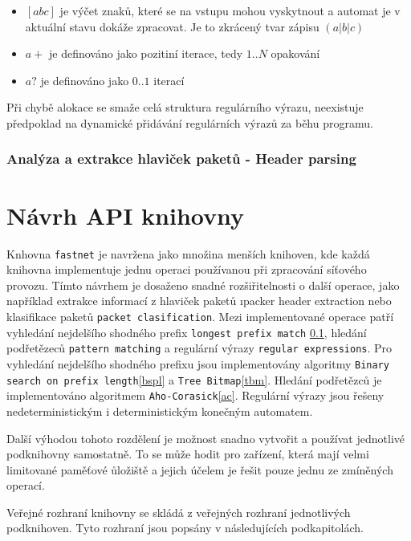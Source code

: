 \begin{itemize}
	\item{$[abc]$ je výčet znaků, které se na vstupu mohou vyskytnout a automat je v aktuální stavu dokáže zpracovat. Je to zkrácený tvar zápisu $(a|b|c)$}
	\item{$a+$ je definováno jako pozitiní iterace, tedy $1..N$ opakování}
	\item{$a?$ je definováno jako $0..1$ iterací}
\end{itemize}

Při chybě alokace se smaže celá struktura regulárního výrazu, neexistuje předpoklad na
dynamické přidávání regulárních výrazů za běhu programu.


\subsection{Analýza a extrakce hlaviček paketů - Header parsing}




\chapter{Návrh API knihovny}\label{chapter:api}
Knhovna \texttt{fastnet} je navržena jako množina menších knihoven, kde každá knihovna implementuje
jednu operaci používanou při zpracování síťového provozu.
Tímto návrhem je dosaženo snadné rozšiřitelnosti o další operace, jako například extrakce informací z hlaviček paketů
\i{packer header extraction} nebo klasifikace paketů \texttt{packet clasification}.
Mezi implementované operace patří vyhledání nejdelšího shodného prefix \texttt{longest prefix match} \ref{},
hledání podřetězeců \texttt{pattern matching} a regulární výrazy \texttt{regular expressions}.
Pro vyhledání nejdelšího shodného prefixu jsou implementovány algoritmy
\texttt{Binary search on prefix length}\ref{bspl} a \texttt{Tree Bitmap}\ref{tbm}.
Hledání podřetězců je implementováno algoritmem \texttt{Aho-Corasick}\ref{ac}.
Regulární výrazy jsou řešeny nedeterministickým i deterministickým konečným automatem.

Další výhodou tohoto rozdělení je možnost snadno vytvořit a používat jednotlivé podknihovny samostatně.
To se může hodit pro zařízení, která mají velmi limitované paměťové ůložiště a jejich účelem
je řešit pouze jednu ze zmíněných operací.

Veřejné rozhraní knihovny se skládá z veřejných rozhraní jednotlivých podknihoven.
Tyto rozhraní jsou popsány v následujících podkapitolách.

